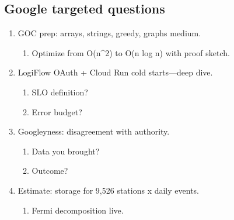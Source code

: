 \documentclass[9pt,a4paper]{article}
\begin{document}
\subsection{Google targeted questions}
\begin{enumerate}[label=\textbf{Q\arabic*:}, leftmargin=*]
  \item GOC prep: arrays, strings, greedy, graphs medium.
  \begin{enumerate}[label=\textit{FU\arabic*:}, leftmargin=2em]
    \item Optimize from O(n\textasciicircum{}2) to O(n log n) with proof sketch.
  \end{enumerate}
  \item LogiFlow OAuth + Cloud Run cold starts---deep dive.
  \begin{enumerate}[label=\textit{FU\arabic*:}, leftmargin=2em]
    \item SLO definition?
    \item Error budget?
  \end{enumerate}
  \item Googleyness: disagreement with authority.
  \begin{enumerate}[label=\textit{FU\arabic*:}, leftmargin=2em]
    \item Data you brought?
    \item Outcome?
  \end{enumerate}
  \item Estimate: storage for 9,526 stations x daily events.
  \begin{enumerate}[label=\textit{FU\arabic*:}, leftmargin=2em]
    \item Fermi decomposition live.
  \end{enumerate}
\end{enumerate}
\end{document}
